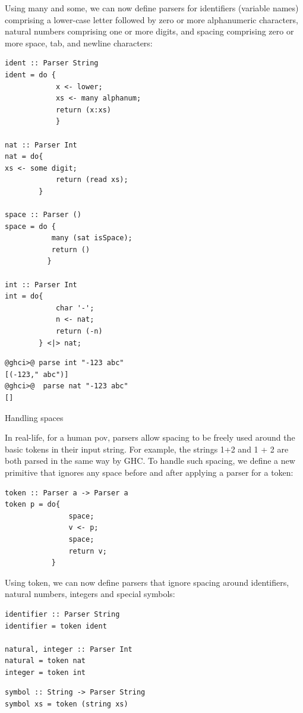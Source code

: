 \documentclass[a4papert]{article}
\begin{document}
Using many and some, we can now define parsers for identifiers (variable names) comprising a lower-case letter followed by zero or more alphanumeric characters, natural numbers comprising one or more digits, and spacing comprising zero or more space, tab, and newline characters:

\begin{lstlisting}[style=haskellstyle]
ident :: Parser String
ident = do {
            x <- lower;
            xs <- many alphanum;
            return (x:xs)
            }

nat :: Parser Int
nat = do{
xs <- some digit;
            return (read xs);
        }

space :: Parser ()
space = do {
           many (sat isSpace);
           return ()
          }

int :: Parser Int
int = do{
            char '-';
            n <- nat;
            return (-n)
        } <|> nat;

\end{lstlisting}
\begin{lstlisting}[style=ghcistyle]
@ghci>@ parse int "-123 abc"
[(-123," abc")]
@ghci>@  parse nat "-123 abc"
[]
\end{lstlisting}


Handling spaces

In real-life, for a human pov, parsers allow spacing to be freely used around the basic tokens in their input string. For example, the strings 1+2 and 1 + 2 are both parsed in the same way by GHC. To handle such spacing, we define a new primitive that ignores any space before and after applying a parser for a token:


\begin{lstlisting}[style=haskellstyle]
token :: Parser a -> Parser a
token p = do{
               space;
               v <- p;
               space;
               return v;
           }
\end{lstlisting}


Using token, we can now define parsers that ignore spacing around identifiers, natural numbers, integers and special symbols:

\begin{lstlisting}[style=haskellstyle]
identifier :: Parser String
identifier = token ident

natural, integer :: Parser Int
natural = token nat
integer = token int

\end{lstlisting}
\begin{lstlisting}[style=haskellstyle]
symbol :: String -> Parser String
symbol xs = token (string xs)
\end{lstlisting}
\end{document}
